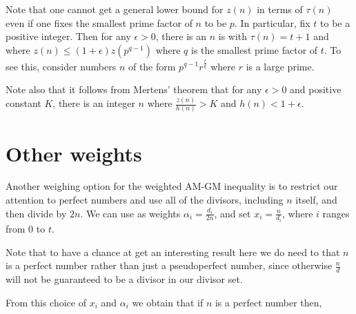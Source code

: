 \documentclass{article}
\begin{document}


Note that one cannot get a general lower bound for $z(n)$ in terms of $\tau(n)$ even if one fixes the smallest prime factor of $n$ to be $p$. In particular, fix $t$ to be a positive integer. Then for any $\epsilon >0$, there is an $n$ is with $\tau(n)=t+1$ and where 
$z(n) \leq(1+\epsilon)z(p^{q-1})$ where $q$ is the smallest prime factor of $t$. To see this, consider numbers $n$ of the form $p^{q-1}r^{\frac{t}q}$ where $r$ is a large prime.

Note also that it follows from Mertens' theorem that for any $\epsilon >0$ and positive constant $K$, there is an integer $n$ where $\frac{z(n)}{h(n)} >K$ and $h(n) < 1+\epsilon$. 

\section{Other weights}

Another weighing option for the weighted AM-GM inequality is to restrict our attention to perfect numbers and use all of the divisors, including $n$ itself, and then divide by $2n$.  We can use as weights $\alpha_i=\frac{d_i}{2n}$, and set $x_i =\frac{n}{d_i}$, where $i$ ranges from $0$ to $t$. 


Note that to have a chance at get an interesting result here we do need to that $n$ is a perfect number rather than just a pseudoperfect number, since otherwise $\frac{n}{d}$ will not be guaranteed to be a divisor in our divisor set.

From this choice of $x_i$ and $\alpha_i$ we obtain that if $n$ is a perfect number then, 
\end{document}
